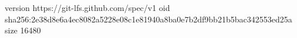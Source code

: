 version https://git-lfs.github.com/spec/v1
oid sha256:2e38d8e6a4ec8082a5228e08c1e81940a8ba0e7b2df9bb21b5bac342553ed25a
size 16480
